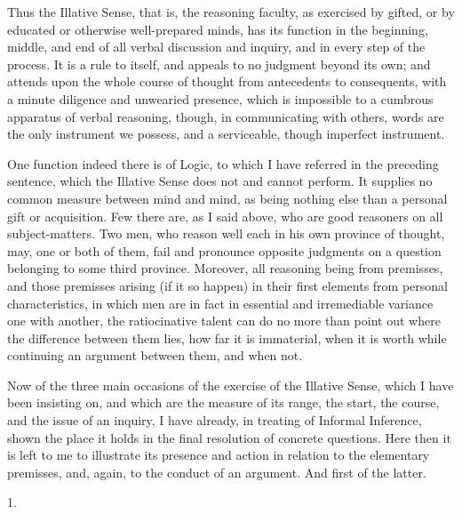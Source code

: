Thus the Illative Sense, that is, the reasoning faculty, as
exercised by gifted, or by educated or otherwise well-prepared minds,
has its function in the beginning, middle, and end of all verbal
discussion and inquiry, and in every step of the process. It is a rule
to itself, and appeals to no judgment beyond its own; and
attends upon the whole course of thought from antecedents to
consequents, with a minute diligence and unwearied presence, which is
impossible to a cumbrous apparatus of verbal reasoning, though, in
communicating with others, words are the only instrument we possess,
and a serviceable, though imperfect instrument.

One function indeed there is of Logic, to which I have referred in
the preceding sentence, which the Illative Sense does not and cannot
perform. It supplies no common measure between mind and mind, as being
nothing else than a personal gift or acquisition. Few there are, as I
said above, who are good reasoners on all subject-matters. Two men,
who reason well each in his own province of thought, may, one or both
of them, fail and pronounce opposite judgments on a question belonging
to some third province. Moreover, all reasoning being from premisses,
and those premisses arising (if it so happen) in their first elements
from personal characteristics, in which men are in fact in essential
and irremediable variance one with another, the ratiocinative talent
can do no more than point out where the difference between them lies,
how far it is immaterial, when it is worth while continuing an
argument between them, and when not.

Now of the three main occasions of the exercise of the Illative
Sense, which I have been insisting on, and which are the measure of
its range, the start, the course, and the issue of an inquiry, I have
already, in treating of Informal Inference, shown the place it holds
in the final resolution of concrete questions. Here then it is left to
me to illustrate its presence and action in relation to the
elementary premisses, and, again, to the conduct of an argument. And
first of the latter.

1.

